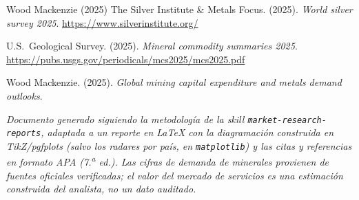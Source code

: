 \documentclass[11pt,letterpaper]{report}
\begin{document}
\begin{thebibliography}{Wood Mackenzie (2025)}
 The Silver Institute \& Metals Focus. (2025). \textit{World silver survey 2025}.
  \url{https://www.silverinstitute.org/}

 U.S.\ Geological Survey. (2025). \textit{Mineral commodity summaries 2025}.
  \url{https://pubs.usgs.gov/periodicals/mcs2025/mcs2025.pdf}

 Wood Mackenzie. (2025). \textit{Global mining capital expenditure and metals demand
  outlooks}.
\end{thebibliography}

\vfill
{\footnotesize\color{darkgray}\textit{Documento generado siguiendo la metodología de la \emph{skill} \texttt{market-research-reports},
adaptada a un reporte en \LaTeX{} con la diagramación construida en TikZ/pgfplots (salvo los radares por país, en \texttt{matplotlib})
y las citas y referencias en formato APA (7.\textsuperscript{a} ed.). Las cifras de demanda de minerales provienen de fuentes oficiales
verificadas; el valor del mercado de servicios es una estimación construida del analista, no un dato auditado.}\par}
\end{document}
